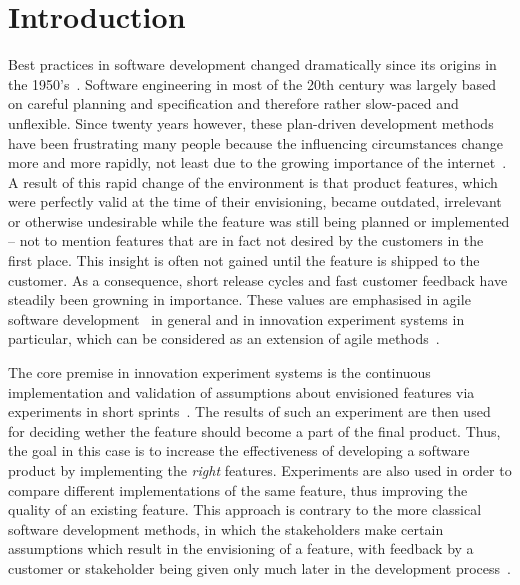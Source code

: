 %
\chapter{Introduction}
\label{sec:intro}

Best practices in software development changed dramatically since its origins in the 1950's~\cite{boehm2006view}.
Software engineering in most of the 20th century was largely based on careful planning and specification and therefore rather slow-paced and unflexible.
Since twenty years however, these plan-driven development methods have been frustrating many people because the influencing circumstances change more and more rapidly, not least due to the growing importance of the internet~\cite{Williams2003}.
A result of this rapid change of the environment is that product features, which were perfectly valid at the time of their envisioning, became outdated, irrelevant or otherwise undesirable while the feature was still being planned or implemented -- not to mention features that are in fact not desired by the customers in the first place.
This insight is often not gained until the feature is shipped to the customer.
As a consequence, short release cycles and fast customer feedback have steadily been growning in importance.
These values are emphasised in agile software development~\cite{fowler2001agile} in general and in innovation experiment systems in particular, which can be considered as an extension of agile methods~\cite{Bosch2012}.

The core premise in innovation experiment systems is the continuous implementation and validation of assumptions about envisioned features via experiments in short sprints~\cite{Bosch2012}.
The results of such an experiment are then used for deciding wether the feature should become a part of the final product.
Thus, the goal in this case is to increase the effectiveness of developing a software product by implementing the \emph{right} features.
Experiments are also used in order to compare different implementations of the same feature, thus improving the quality of an existing feature.
This approach is contrary to the more classical software development methods, in which the stakeholders make certain assumptions which result in the envisioning of a feature, with feedback by a customer or stakeholder being given only much later in the development process~\cite{Bosch2012}.

